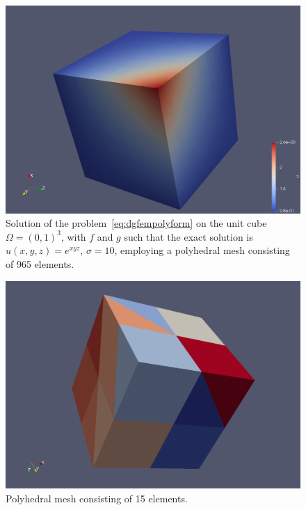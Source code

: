 \documentclass[12pt, a4paper]{article}
\theoremstyle{definition}
\theoremstyle{plain}
\theoremstyle{plain}
\theoremstyle{definition}
\begin{document}
\begin{figure}[p] 
	\centering
	\includegraphics[scale=0.15]{solution_3072p}
	\caption{Solution of the problem~\eqref{eq:dgfempolyform} on the unit cube $\Omega = (0,1)^3$, with $f$ and $g$ such that the exact solution is $u(x,y,z)=e^{xyz}$, $\sigma=10$, employing a polyhedral mesh consisting of 965 elements.}
	\label{fig:sol}
\end{figure}
\begin{figure}[p]
	\centering
	\includegraphics[scale=0.30]{mesh_48p}
	\caption{Polyhedral mesh consisting of 15 elements.}
	\label{fig:mesh}
\end{figure}
\end{document}
